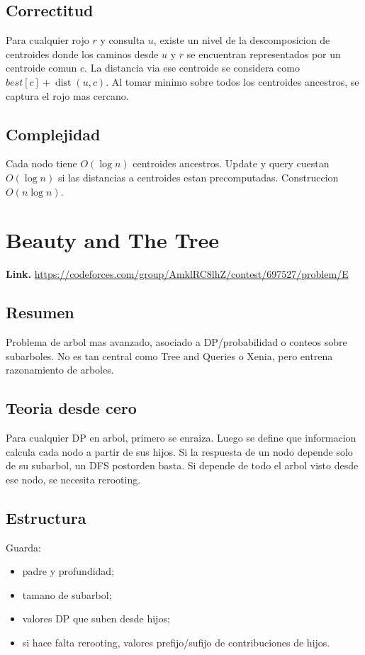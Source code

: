 \documentclass[10pt]{article}
\newcommand{\bigO}{O}
\newcommand{\dist}{\operatorname{dist}}
\begin{document}
\subsection*{Correctitud}
Para cualquier rojo $r$ y consulta $u$, existe un nivel de la descomposicion de
centroides donde los caminos desde $u$ y $r$ se encuentran representados por un
centroide comun $c$. La distancia via ese centroide se considera como
$best[c]+\dist(u,c)$. Al tomar minimo sobre todos los centroides ancestros, se
captura el rojo mas cercano.

\subsection*{Complejidad}
Cada nodo tiene $\bigO(\log n)$ centroides ancestros. Update y query cuestan
$\bigO(\log n)$ si las distancias a centroides estan precomputadas. Construccion
$\bigO(n\log n)$.

\clearpage
\section{Beauty and The Tree}
\textbf{Link.} \url{https://codeforces.com/group/AmklRC8lhZ/contest/697527/problem/E}

\subsection*{Resumen}
Problema de arbol mas avanzado, asociado a DP/probabilidad o conteos sobre
subarboles. No es tan central como Tree and Queries o Xenia, pero entrena
razonamiento de arboles.

\subsection*{Teoria desde cero}
Para cualquier DP en arbol, primero se enraiza. Luego se define que informacion
calcula cada nodo a partir de sus hijos. Si la respuesta de un nodo depende solo
de su subarbol, un DFS postorden basta. Si depende de todo el arbol visto desde
ese nodo, se necesita rerooting.

\subsection*{Estructura}
Guarda:
\begin{itemize}[leftmargin=*]
\item padre y profundidad;
\item tamano de subarbol;
\item valores DP que suben desde hijos;
\item si hace falta rerooting, valores prefijo/sufijo de contribuciones de hijos.
\end{itemize}
\end{document}
